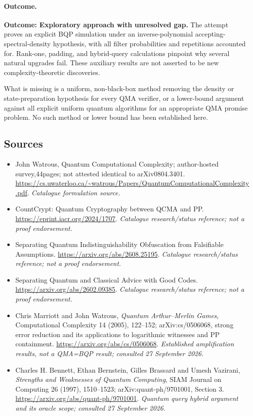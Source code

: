 \documentclass[11pt,a4paper]{article}
\numberwithin{equation}{section}
\begin{document}
\paragraph{Outcome.}
\textbf{Outcome: Exploratory approach with unresolved gap.}
The attempt proves an explicit BQP simulation under an inverse-polynomial
accepting-spectral-density hypothesis, with all filter probabilities and
repetitions accounted for. Rank-one, padding, and hybrid-query calculations
pinpoint why several natural upgrades fail. These auxiliary results are
not asserted to be new complexity-theoretic discoveries.

What is missing is a uniform, non-black-box method removing the density or
state-preparation hypothesis for every QMA verifier, or a lower-bound
argument against all explicit uniform quantum algorithms for an appropriate
QMA promise problem. No such method or lower bound has been established here.
\subsection{Sources}
\begin{itemize}\raggedright
\item[\textnormal{[S1]}]\hypertarget{source:48:1}{} John Watrous, Quantum Computational Complexity; author-hosted survey,44pages; not attested identical to arXiv0804.3401.
\url{https://cs.uwaterloo.ca/~watrous/Papers/QuantumComputationalComplexity.pdf}.
{\small\textit{Catalogue formulation source.}}
\item[\textnormal{[S2]}]\hypertarget{source:48:2}{} CountCrypt: Quantum Cryptography between QCMA and PP.
\url{https://eprint.iacr.org/2024/1707}.
{\small\textit{Catalogue research/status reference; not a proof endorsement.}}
\item[\textnormal{[S3]}]\hypertarget{source:48:3}{} Separating Quantum Indistinguishability Obfuscation from Falsifiable Assumptions.
\url{https://arxiv.org/abs/2608.25195}.
{\small\textit{Catalogue research/status reference; not a proof endorsement.}}
\item[\textnormal{[S4]}]\hypertarget{source:48:4}{} Separating Quantum and Classical Advice with Good Codes.
\url{https://arxiv.org/abs/2602.09385}.
{\small\textit{Catalogue research/status reference; not a proof endorsement.}}
\item[\textnormal{[E1]}]\hypertarget{extra:48:1}{} Chris Marriott and
John Watrous, \emph{Quantum Arthur--Merlin Games}, Computational Complexity
14 (2005), 122--152; arXiv:cs/0506068, strong error reduction and its
applications to logarithmic witnesses and PP containment.
\url{https://arxiv.org/abs/cs/0506068}.
{\small\textit{Established amplification results, not a QMA=BQP result;
consulted 27 September 2026.}}
\item[\textnormal{[E2]}]\hypertarget{extra:48:2}{} Charles H. Bennett,
Ethan Bernstein, Gilles Brassard and Umesh Vazirani,
\emph{Strengths and Weaknesses of Quantum Computing}, SIAM Journal on
Computing 26 (1997), 1510--1523; arXiv:quant-ph/9701001, Section 3.
\url{https://arxiv.org/abs/quant-ph/9701001}.
{\small\textit{Quantum query hybrid argument and its oracle scope;
consulted 27 September 2026.}}
\end{itemize}
\end{document}
